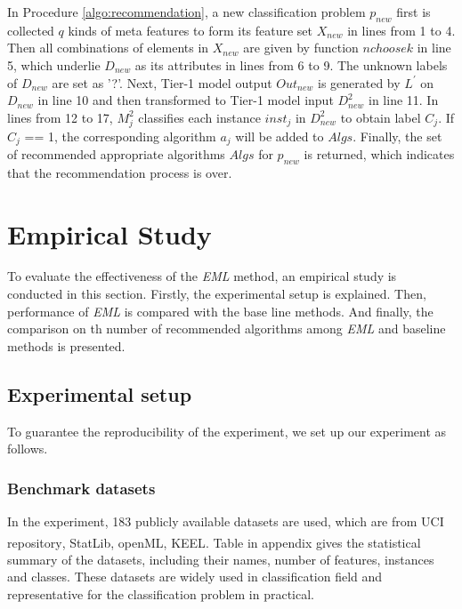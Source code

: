 \documentclass[review,3p,twocolumn,times]{elsarticle}
\newcommand{\upcite}[1]{\textsuperscript{\cite{#1}}}
\begin{document}
 In Procedure \ref{algo:recommendation}, a new classification problem $p_{new}$ first is collected $q$ kinds of meta features to form its feature set $X_{new}$ in lines from 1 to 4. Then all combinations of elements in $X_{new}$ are given by function $nchoosek$ in line 5, which underlie $D_{new}$ as its attributes in lines from 6 to 9. The unknown labels of $D_{new}$ are set as '?'. Next, Tier-1 model output $Out_{new}$ is generated by $L^{'}$ on $D_{new}$ in  line 10 and then transformed to Tier-1 model input $D^2_{new}$ in line 11. In lines from 12 to 17, $M^2_j$ classifies each instance $inst_j$ in $D^2_{new}$ to obtain label $C_j$. If $C_j$ == 1, the corresponding algorithm $a_j$ will be added to $Algs$. Finally, the set of recommended appropriate algorithms $Algs$ for $p_{new}$ is returned, which indicates that the recommendation process is over.

\section{Empirical Study}
\label{experiment}

To evaluate the effectiveness of the \emph{EML} method, an empirical study is conducted in this section. Firstly, the experimental setup is explained. Then, performance of \emph{EML} is compared with the base line methods. And finally, the comparison on th number of recommended algorithms among \emph{EML} and baseline methods is presented.%

\subsection{Experimental setup}

To guarantee the reproducibility of the experiment, we set up our experiment as follows.

\subsubsection{Benchmark datasets}

In the experiment, 183 publicly available datasets are used, which are  from UCI repository\upcite{Dua2019UCI}, StatLib\upcite{Pantelis2005}, openML\upcite{OpenMLR2017}, KEEL\upcite{alcala2011keel}. Table in appendix gives the statistical summary of the datasets, including their names, number of features, instances and classes. These datasets are widely used in classification field and representative for the classification problem in practical. 		
\end{document}
